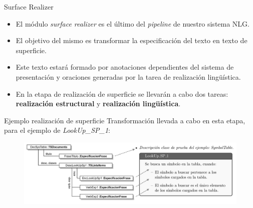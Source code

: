 \documentclass[pdf]{beamer}
\begin{document}
\begin{frame}{Surface Realizer}{}
  \begin{itemize}
    \item El módulo \emph{surface realizer} es el último del \emph{pipeline} de nuestro sistema NLG.

    \item El objetivo del mismo es transformar la especificación del texto en texto de superficie. 

    \item Este texto estará formado por anotaciones dependientes del sistema de presentación y oraciones generadas por la tarea de realización lingüística.


    \item En la etapa de realización de superficie se llevarán a cabo dos tareas: \textbf{realización estructural} y \textbf{realización lingüística}.
  \end{itemize}
\end{frame}

\begin{frame}[fragile]{Ejemplo realización de superficie}{}
  Transformación llevada a cabo en esta etapa, para el ejemplo de \emph{LookUp\_SP\_1}:
  \begin{figure}[H]
    \centering
    \includegraphics[scale=0.3]{img/ej_text_spec.png}
  \end{figure}
\end{frame}
\end{document}
